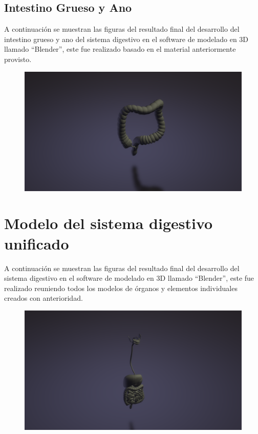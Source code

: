 \subsection{Intestino Grueso y Ano}
A continuación se muestran las figuras del resultado final del desarrollo del intestino grueso y ano del sistema digestivo en el software de modelado en 3D llamado “Blender”, este fue realizado basado en el material anteriormente provisto.\\
\begin{figure}[H]
	\begin{center}
 		\includegraphics[width = .5\textwidth]{source/images/image20.png}
	\end{center} 
\end{figure}

\section{Modelo del sistema digestivo unificado}
A continuación se muestran las figuras del resultado final del desarrollo del sistema digestivo en el software de modelado en 3D llamado “Blender”, este fue realizado reuniendo todos los modelos de órganos y elementos individuales creados con anterioridad.\\
\begin{figure}[H]
	\begin{center}
 		\includegraphics[width = 1\textwidth]{source/images/image24.png}
	\end{center} 
\end{figure}

